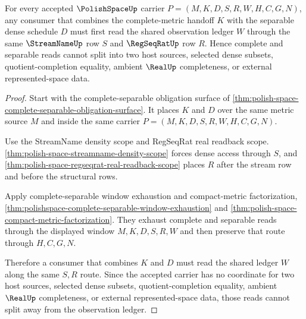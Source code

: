 \begin{theorem}
\label{thm:polish-space-complete-separable-observation-lock}
For every accepted $\PolishSpaceUp$ carrier $P=(M,K,D,S,R,W,H,C,G,N)$, any consumer that combines the complete-metric handoff $K$ with the separable dense schedule $D$ must first read the shared observation ledger $W$ through the same $\StreamNameUp$ row $S$ and $\RegSeqRatUp$ row $R$. Hence complete and separable reads cannot split into two host sources, selected dense subsets, quotient-completion equality, ambient $\RealUp$ completeness, or external represented-space data.
\end{theorem}
\begin{proof}
Start with the complete-separable obligation surface of \autoref{thm:polish-space-complete-separable-obligation-surface}. It places $K$ and $D$ over the same metric source $M$ and inside the same carrier $P=(M,K,D,S,R,W,H,C,G,N)$.

Use the StreamName density scope and RegSeqRat real readback scope. \autoref{thm:polish-space-streamname-density-scope} forces dense access through $S$, and \autoref{thm:polish-space-regseqrat-real-readback-scope} places $R$ after the stream row and before the structural rows.

Apply complete-separable window exhaustion and compact-metric factorization, \autoref{thm:polishspace-complete-separable-window-exhaustion} and \autoref{thm:polish-space-compact-metric-factorization}. They exhaust complete and separable reads through the displayed window $M,K,D,S,R,W$ and then preserve that route through $H,C,G,N$.

Therefore a consumer that combines $K$ and $D$ must read the shared ledger $W$ along the same $S,R$ route. Since the accepted carrier has no coordinate for two host sources, selected dense subsets, quotient-completion equality, ambient $\RealUp$ completeness, or external represented-space data, those reads cannot split away from the observation ledger.
\end{proof}

